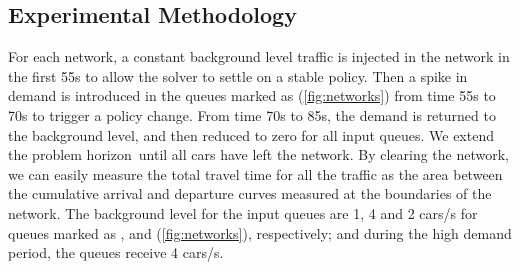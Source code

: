 \subsection{Experimental Methodology}



For each network, a constant background level traffic is injected in the network
in the first 55s to allow the solver to settle on a stable policy.
%
Then a spike in demand is introduced in the queues marked as \qVarTraf
(\cref{fig:networks}) from time 55s to 70s to trigger a policy change.
%
%
From time 70s to 85s, the demand is returned to the background level, and then
reduced to zero for all input queues.
%
We extend the problem horizon~\TMAX until all cars have left the network.
%
By clearing the network, we can easily measure the total travel time for all the
traffic as the area between the cumulative arrival and departure curves measured
at the boundaries of the network.
%
%
The background level for the input queues are 1, 4 and 2 cars/s for queues
marked as \qLowTraf, \qHighTraf and \qVarTraf (\cref{fig:networks}),
respectively; and during the high demand period, the queues \qVarTraf receive 4
cars/s.




